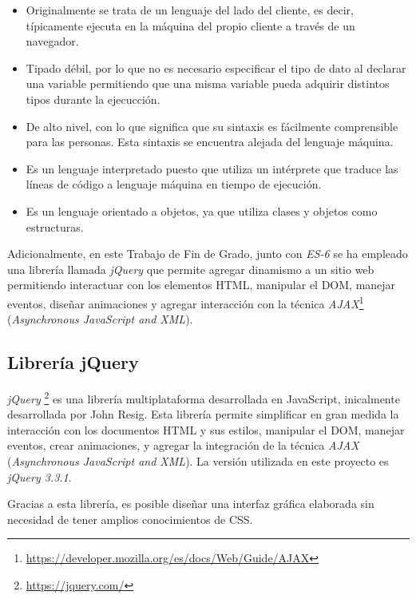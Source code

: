 \documentclass[a4paper, 12pt]{book}
\begin{document}
\begin{itemize}
	\item Originalmente se trata de un lenguaje del lado del cliente, es decir, típicamente ejecuta en la máquina del propio cliente a través de un navegador.
	
	\item Tipado débil, por lo que no es necesario especificar el tipo de dato al declarar una variable permitiendo que una misma variable pueda adquirir distintos tipos durante la ejecucción.
	
	\item De alto nivel, con lo que significa que su sintaxis es fácilmente comprensible para las personas. Esta sintaxis se encuentra alejada del lenguaje máquina.
	
	\item Es un lenguaje interpretado puesto que utiliza un intérprete que traduce las líneas de código a lenguaje máquina en tiempo de ejecución.

	\item Es un lenguaje orientado a objetos, ya que utiliza clases y objetos como estructuras.
\end{itemize}

Adicionalmente, en este Trabajo de Fin de Grado, junto con \textit{ES-6} se ha empleado una librería llamada \textit{jQuery} que permite agregar dinamismo a un sitio web permitiendo interactuar con los elementos HTML, manipular el DOM, manejar eventos, diseñar animaciones y agregar interacción con la técnica \textit{AJAX}\footnote{\url{https://developer.mozilla.org/es/docs/Web/Guide/AJAX}} (\textit{Asynchronous JavaScript and XML}).

\subsection{Librería jQuery}
\label{subsec:javascript}

\textit{jQuery} \footnote{\url{https://jquery.com/}} es una librería multiplataforma desarrollada en JavaScript, inicalmente desarrollada por John Resig. Esta librería permite simplificar en gran medida la interacción con los documentos HTML y sus estilos, manipular el DOM, manejar eventos, crear animaciones, y agregar la integración de la técnica \textit{AJAX} (\textit{Asynchronous JavaScript and XML}). La versión utilizada en este proyecto es \emph{jQuery 3.3.1}.

Gracias a esta librería, es posible diseñar una interfaz gráfica elaborada sin necesidad de tener amplios conocimientos de CSS.
\end{document}
